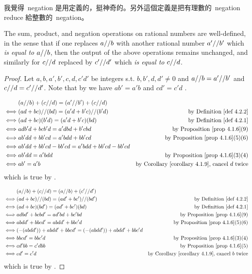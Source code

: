 \begin{note}
我覺得\ negation 是用定義的，挺神奇的。另外這個定義是把有理數的\ negation reduce 給整數的\ negation。
\end{note}

\begin{lemma} \label{lem 4.2.3}
The sum, product, and negation operations on rational numbers are well-defined,
in the sense that if one replaces \(a \text{//} b\) with another rational number \(a' \text{//} b'\) which \emph{is equal to} \(a \text{//} b\), then the output
of the above operations remains unchanged, and similarly for \(c \text{//} d\) replaced by \(c' \text{//} d'\) which \emph{is equal to} \(c \text{//} d\).
\end{lemma}

\begin{proof} 
Let \(a, b, a', b', c, d, c' d'\) be integers s.t. \(b, b', d, d' \neq 0\) and \(a \text{//} b = a' \text{//} b'\) and \(c \text{//} d = c' \text{//} d'\).
Note that by  we have \(ab' = a'b\)  and \(cd' = c'd\) .

\begin{align*}
         & (a \D b) + (c \D d) = (a' \D b') + (c \D d) \\
    \iff & (ad + bc) \D (bd) = (a'd + b'c) \D (b'd) & \text{by \DEF{4.2.2}} \\
    \iff & (ad + bc)(b'd) = (a'd + b'c)(bd) & \text{by \DEF{4.2.1}} \\
    \iff & adb'd + bcb'd = a'dbd + b'cbd & \text{by \PROP{4.1.6}(9)} \\
    \iff & ab'dd + bb'cd = a'bdd + bb'cd & \text{by \PROP{4.1.6}(5)(6)} \\
    \iff & ab'dd + bb'cd - bb'cd = a'bdd + bb'cd - bb'cd \\
    \iff & ab'dd = a'bdd & \text{by \PROP{4.1.6}(3)(4)} \\
    \iff & ab' = a'b & \text{by \CORO{4.1.9}, cancel \(d\) twice} \\
\end{align*}
which is true by .

\begin{align*}
         & (a \D b) + (c \D d) = (a \D b) + (c' \D d') \\
    \iff & (ad + bc) \D (bd) = (ad' + bc') \D (bd') & \text{by \DEF{4.2.2}} \\
    \iff & (ad + bc)(bd') = (ad' + bc')(bd) & \text{by \DEF{4.2.1}} \\
    \iff & adbd' + bcbd' = ad'bd + bc'bd & \text{by \PROP{4.1.6}(9)} \\
    \iff & abdd' + bbcd' = abdd' + bbc'd & \text{by \PROP{4.1.6}(5)(6)} \\
    \iff & (-(abdd')) + abdd' + bbcd' = (-(abdd')) + abdd' + bbc'd \\
    \iff & bbcd' = bbc'd & \text{by \PROP{4.1.6}(3)(4)} \\
    \iff & cd'bb = c'dbb & \text{by \PROP{4.1.6}(5)} \\
    \iff & cd' = c'd & \text{by \CORO{4.1.9}, cancel \(b\) twice} \\
\end{align*}
which is true by .


\end{proof}
